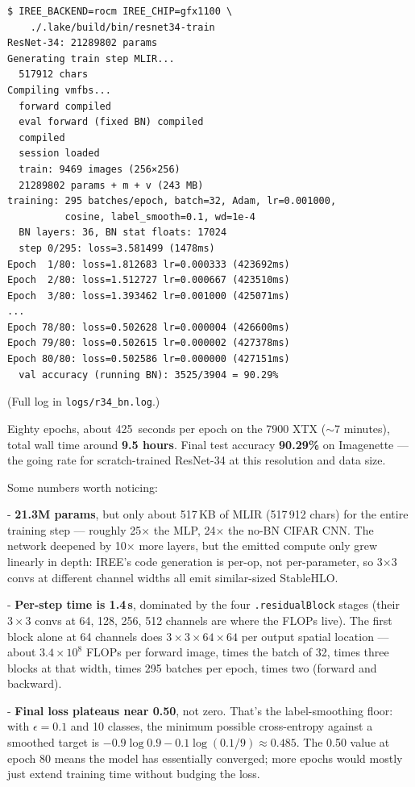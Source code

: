 \begin{verbatim}
$ IREE_BACKEND=rocm IREE_CHIP=gfx1100 \
    ./.lake/build/bin/resnet34-train
ResNet-34: 21289802 params
Generating train step MLIR...
  517912 chars
Compiling vmfbs...
  forward compiled
  eval forward (fixed BN) compiled
  compiled
  session loaded
  train: 9469 images (256×256)
  21289802 params + m + v (243 MB)
training: 295 batches/epoch, batch=32, Adam, lr=0.001000,
          cosine, label_smooth=0.1, wd=1e-4
  BN layers: 36, BN stat floats: 17024
  step 0/295: loss=3.581499 (1478ms)
Epoch  1/80: loss=1.812683 lr=0.000333 (423692ms)
Epoch  2/80: loss=1.512727 lr=0.000667 (423510ms)
Epoch  3/80: loss=1.393462 lr=0.001000 (425071ms)
...
Epoch 78/80: loss=0.502628 lr=0.000004 (426600ms)
Epoch 79/80: loss=0.502615 lr=0.000002 (427378ms)
Epoch 80/80: loss=0.502586 lr=0.000000 (427151ms)
  val accuracy (running BN): 3525/3904 = 90.29%
\end{verbatim}

(Full log in \texttt{logs/r34\_bn.log}.)

Eighty epochs, about 425~seconds per epoch on the 7900 XTX ($\sim$7
minutes), total wall time around \textbf{9.5 hours}. Final test
accuracy \textbf{90.29\%} on Imagenette --- the going rate for
scratch-trained ResNet-34 at this resolution and data size.

Some numbers worth noticing:

- \textbf{21.3M params}, but only about 517\,KB of MLIR
  (517\,912 chars) for the entire training step --- roughly
  25$\times$ the MLP, 24$\times$ the no-BN CIFAR CNN. The network
  deepened by 10$\times$ more layers, but the emitted compute only
  grew linearly in depth: IREE's code generation is per-op, not
  per-parameter, so 3$\times$3 convs at different channel widths
  all emit similar-sized StableHLO.

- \textbf{Per-step time is 1.4\,s}, dominated by the four
  \texttt{.residualBlock} stages (their $3 \times 3$ convs at 64,
  128, 256, 512 channels are where the FLOPs live). The first
  block alone at 64 channels does $3 \times 3 \times 64 \times 64$
  per output spatial location --- about $3.4 \times 10^8$ FLOPs per
  forward image, times the batch of 32, times three blocks at that
  width, times 295 batches per epoch, times two (forward and
  backward).

- \textbf{Final loss plateaus near 0.50}, not zero. That's the
  label-smoothing floor: with $\epsilon = 0.1$ and 10 classes, the
  minimum possible cross-entropy against a smoothed target is
  $-0.9 \log 0.9 - 0.1 \log (0.1/9) \approx 0.485$. The 0.50 value
  at epoch 80 means the model has essentially converged; more
  epochs would mostly just extend training time without budging the
  loss.

